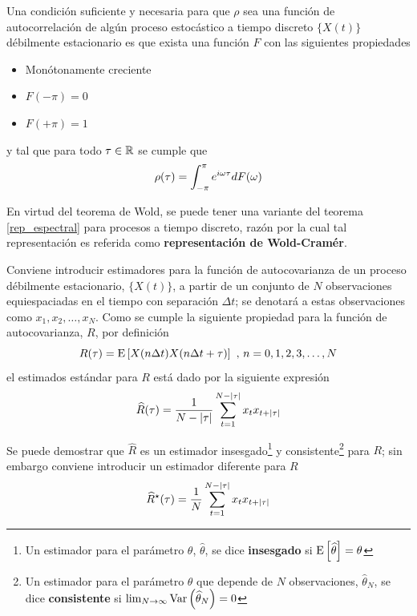 \begin{teorema}[Wold]
Una condición suficiente y necesaria para que $\rho$ sea una función de autocorrelación de 
algún proceso estocástico a tiempo discreto $\{X(t)\}$ débilmente estacionario es que exista 
una función $F$ con las siguientes propiedades
\begin{itemize}
\item Monótonamente creciente
\item $F(-\pi) = 0$
\item $F(+\pi) = 1$
\end{itemize}
y tal que para todo $\tau \in \mathbb{R}$ se cumple que
\begin{equation*}
\rho(\tau) = \int_{-\pi}^{\pi} e^{i \omega \tau} dF(\omega)
\end{equation*}
\label{t_wold}
\end{teorema}

En virtud del teorema de Wold, se puede tener una variante del teorema \ref{rep_espectral}
para procesos a tiempo discreto, razón por la cual  
tal representación es referida como \textbf{representación de Wold-Cramér}.


Conviene introducir estimadores para la función de autocovarianza de un proceso débilmente 
estacionario, $\{ X(t) \}$, a partir de un conjunto de $N$ observaciones equiespaciadas en el 
tiempo con separación $\Delta t$; se denotará a estas observaciones como 
$x_1, x_2 , \dots, x_N$. Como se cumple la siguiente propiedad para la función de autocovarianza, 
$R$, por definición
\begin{equation*}
R(\tau) = \mathrm{E}\left[ X(n\Delta t)X(n\Delta t + \tau) \right] \text{  ,  } n = 0, 1, 2,  3,\dots, N
\end{equation*}
el estimados estándar para $R$ está dado por la siguiente expresión
\begin{equation*}
\widehat{R}(\tau) = \frac{1}{N-\left| \tau \right|} 
\sum_{t = 1}^{N-\left| \tau \right|} x_t x_{t+\left| \tau \right|}
\label{estimador_R}
\end{equation*}

Se puede demostrar que $\widehat{R}$ es un estimador insesgado\footnote{Un estimador para el 
parámetro $\theta$, $\widehat{\theta}$, se dice \textbf{insesgado} si 
$\mathrm{E}\left[ \widehat{\theta} \right]=\theta$} y consistente\footnote{Un estimador para el parámetro $\theta$ que 
depende de $N$ observaciones, 
$\widehat{\theta}_N$, se dice \textbf{consistente} si 
$\lim_{N\rightarrow \infty} \mathrm{Var}\left( \widehat{\theta}_N \right) = 0$} 
para $R$; sin embargo conviene introducir un estimador diferente para $R$
\begin{equation*}
\widehat{ R }^{\star}(\tau) = \frac{1}{N} 
\sum_{t = 1}^{N-\left| \tau \right|} x_t x_{t+\left| \tau \right|}
\label{estimador_R_ast}
\end{equation*}

